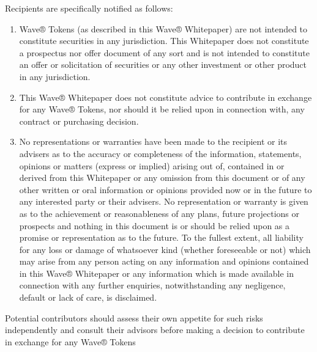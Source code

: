 \documentclass[letterpaper,10pt,openany,oneside,english]{sphinxmanual}
\begin{document}
Recipients are specifically notified as follows:
\begin{enumerate}
\item {} 
 Wave® Tokens (as described in this Wave® Whitepaper) are not intended to constitute securities in any jurisdiction. This Whitepaper does not constitute a prospectus nor offer document of any sort and is not intended to constitute an offer or solicitation of securities or any other investment or other product in any jurisdiction.

\item {} 
 This Wave® Whitepaper does not constitute advice to contribute in exchange for any Wave® Tokens, nor should it be relied upon in connection with, any contract or purchasing decision.

\item {} 
 No representations or warranties have been made to the recipient or its advisers as to the accuracy or completeness of the information, statements, opinions or matters (express or implied) arising out of, contained in or derived from this Whitepaper or any omission from this document or of any other written or oral information or opinions provided now or in the future to any interested party or their advisers. No representation or warranty is given as to the achievement or reasonableness of any plans, future projections or prospects and nothing in this document is or should be relied upon as a promise or representation as to the future. To the fullest extent, all liability for any loss or damage of whatsoever kind (whether foreseeable or not) which may arise from any person acting on any information and opinions contained in this Wave® Whitepaper or any information which is made available in connection with any further enquiries, notwithstanding any negligence, default or lack of care, is disclaimed.

\end{enumerate}

 Potential contributors should assess their own appetite for such risks independently and consult their advisors before making a decision to contribute in exchange for any Wave® Tokens



\renewcommand{\indexname}{Index}
\printindex
\end{document}
